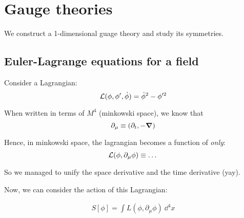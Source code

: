 \chapter{Gauge theories}
We construct a 1-dimensional guage theory and study its symmetries.

\section{Euler-Lagrange equations for a field}
Consider a Lagrangian:
$$\mathcal{L}(\phi, \phi', \dot \phi) = {\dot \phi}^2  - \phi'^2$$

When written in terms of $M^4$ (minkowski space), we know that
$$
\partial_\mu \equiv (\partial_{t}, - \grad)
$$

Hence, in minkowski space, the lagrangian becomes a function of \textit{only}:
$$
\mathcal{L}(\phi, \partial_\mu \phi) \equiv \dots
$$

So we managed to unify the space derivative and the time derivative (yay).

Now, we can consider the action of this Lagrangian:

\begin{align*}
    S[\phi] = \int L(\phi, \partial_\mu \phi)~\dd^4x
\end{align*}

